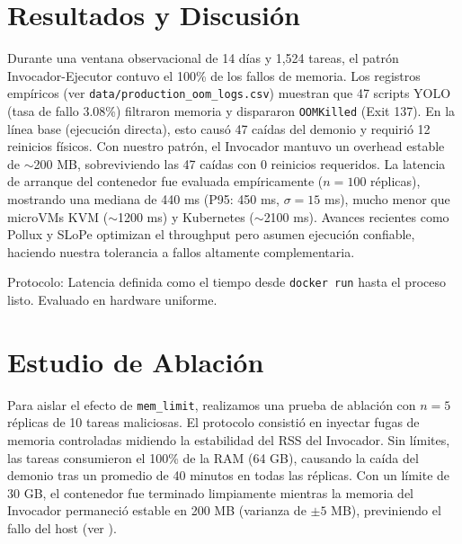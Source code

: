 \documentclass[10pt,twocolumn,letterpaper]{article}
\begin{document}
\section{Resultados y Discusión}
Durante una ventana observacional de 14 días y 1,524 tareas, el patrón Invocador-Ejecutor contuvo el 100\% de los fallos de memoria. Los registros empíricos (ver \texttt{data/production\_oom\_logs.csv}) muestran que 47 scripts YOLO (tasa de fallo 3.08\%) filtraron memoria y dispararon \texttt{OOMKilled} (Exit 137). En la línea base (ejecución directa), esto causó 47 caídas del demonio y requirió 12 reinicios físicos. Con nuestro patrón, el Invocador mantuvo un overhead estable de $\sim$200 MB, sobreviviendo las 47 caídas con 0 reinicios requeridos. La latencia de arranque del contenedor fue evaluada empíricamente ($n=100$ réplicas), mostrando una mediana de 440 ms (P95: 450 ms, $\sigma=15$ ms), mucho menor que microVMs KVM ($\sim$1200 ms) y Kubernetes ($\sim$2100 ms). Avances recientes como Pollux \cite{qiao2021pollux,zhang2024slope,qiao2023fault} y SLoPe \cite{zhang2024slope} optimizan el throughput pero asumen ejecución confiable, haciendo nuestra tolerancia a fallos \cite{qiao2023fault} altamente complementaria.

\begin{table}[htbp]
\centering
\caption{Comparación de Runtimes}
\noindent Protocolo: Latencia definida como el tiempo desde \texttt{\footnotesize docker run} hasta el proceso listo. Evaluado en hardware uniforme.
\end{table}

\section{Estudio de Ablación}
Para aislar el efecto de \texttt{mem\_limit}, realizamos una prueba de ablación con $n=5$ réplicas de 10 tareas maliciosas. El protocolo consistió en inyectar fugas de memoria controladas midiendo la estabilidad del RSS del Invocador. Sin límites, las tareas consumieron el 100\% de la RAM (64 GB), causando la caída del demonio tras un promedio de 40 minutos en todas las réplicas. Con un límite de 30 GB, el contenedor fue terminado limpiamente mientras la memoria del Invocador permaneció estable en 200 MB (varianza de $\pm 5$ MB), previniendo el fallo del host (ver ).
\end{document}
